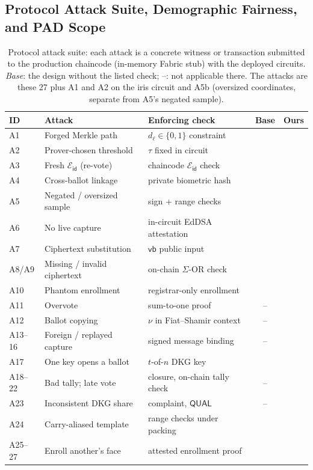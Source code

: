 \documentclass[10pt,letterpaper,journal]{IEEEtran}
\newcommand{\cmark}{\textcolor{green!60!black}{\ding{51}}}   %
\newcommand{\xmark}{\textcolor{red}{\ding{55}}}
\begin{document}
\subsection{Protocol Attack Suite, Demographic Fairness, and PAD Scope}
\label{subsec:eval_fairness_pad}

\begin{table}[t]
\caption{Protocol attack suite: each attack is a concrete witness or transaction submitted to the production chaincode (in-memory Fabric stub) with the deployed circuits. \emph{Base}: the design without the listed check; --: not applicable there. The \nAttacks{} attacks are these 27 plus A1 and A2 on the iris circuit and A5b (oversized coordinates, separate from A5's negated sample).}
\label{tab:attack_suite}
\centering
\footnotesize
\setlength{\tabcolsep}{2.5pt}
\renewcommand{\arraystretch}{0.9}
\begin{tabular}{@{}llp{2.85cm}cc@{}}
\toprule
\textbf{ID} & \textbf{Attack} & \textbf{Enforcing check} & \textbf{Base} & \textbf{Ours} \\
\midrule
A1 & Forged Merkle path & $d_\ell \in \{0,1\}$ constraint & \xmark & \cmark \\
A2 & Prover-chosen threshold & $\tau$ fixed in circuit & \xmark & \cmark \\
A3 & Fresh $\mathcal{E}_{\mathsf{id}}$ (re-vote) & chaincode $\mathcal{E}_{\mathsf{id}}$ check & \xmark & \cmark \\
A4 & Cross-ballot linkage & private biometric hash & \xmark & \cmark \\
A5 & Negated / oversized sample & sign + range checks & \xmark & \cmark \\
A6 & No live capture & in-circuit EdDSA attestation & \xmark & \cmark \\
A7 & Ciphertext substitution & $\mathsf{vb}$ public input & \xmark & \cmark \\
A8/A9 & Missing / invalid ciphertext & on-chain $\Sigma$-OR check & \xmark & \cmark \\
A10 & Phantom enrollment & registrar-only enrollment & \xmark & \cmark \\
A11 & Overvote & sum-to-one proof & -- & \cmark \\
A12 & Ballot copying & $\nu$ in Fiat--Shamir context & -- & \cmark \\
A13--16 & Foreign / replayed capture & signed message binding & -- & \cmark \\
A17 & One key opens a ballot & $t$-of-$n$ DKG key & \xmark & \cmark \\
A18--22 & Bad tally; late vote & closure, on-chain tally check & -- & \cmark \\
A23 & Inconsistent DKG share & complaint, $\mathsf{QUAL}$ & -- & \cmark \\
A24 & Carry-aliased template & range checks under packing & \xmark & \cmark \\
A25--27 & Enroll another's face & attested enrollment proof & \xmark & \cmark \\
\bottomrule
\end{tabular}
\end{table}
\end{document}
